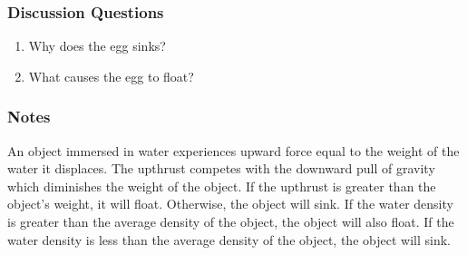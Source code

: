 \subsubsection*{Discussion Questions}
\begin{enumerate}
\item{Why does the egg sinks?}
\item{What causes the egg to float?}
\end{enumerate}

\subsubsection*{Notes}
An object immersed in water experiences upward force equal to the weight of the water it displaces. The upthrust competes with the downward pull of gravity which diminishes the weight of the object. If the upthrust is greater than the object's weight, it will float. Otherwise, the object will sink. If the water density is greater than the average density of the object, the object will also float. If the water density is less than the average density of the object, the object will sink.  
